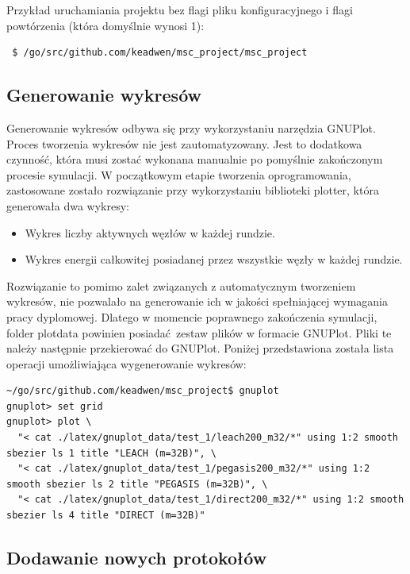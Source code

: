 \documentclass[a4paper,12pt,twoside,openany]{report}
\begin{document}
Przykład uruchamiania projektu bez flagi pliku konfiguracyjnego i flagi powtórzenia (która domyślnie wynosi 1):

\begin{lstlisting}
 $ /go/src/github.com/keadwen/msc_project/msc_project
\end{lstlisting}

\subsection{Generowanie wykresów}

Generowanie wykresów odbywa się przy wykorzystaniu narzędzia GNUPlot. Proces tworzenia wykresów nie jest zautomatyzowany.
Jest to dodatkowa czynność, która musi zostać wykonana manualnie po pomyślnie zakończonym procesie symulacji.
W początkowym etapie tworzenia oprogramowania, zastosowane zostało rozwiązanie przy wykorzystaniu biblioteki plotter, która
generowała dwa wykresy:

\begin{itemize}
 \item Wykres liczby aktywnych węzłów w każdej rundzie.
 \item Wykres energii całkowitej posiadanej przez wszystkie węzły w każdej rundzie.
\end{itemize}

Rozwiązanie to pomimo zalet związanych z automatycznym tworzeniem wykresów, nie pozwalało na generowanie ich w jakości spełniającej
wymagania pracy dyplomowej. Dlatego w momencie poprawnego zakończenia symulacji, folder plotdata powinien posiadać zestaw plików w formacie GNUPlot.
Pliki te należy następnie przekierować do GNUPlot. Poniżej przedstawiona została lista operacji umożliwiająca wygenerowanie wykresów:

\begin{lstlisting}
~/go/src/github.com/keadwen/msc_project$ gnuplot
gnuplot> set grid
gnuplot> plot \
  "< cat ./latex/gnuplot_data/test_1/leach200_m32/*" using 1:2 smooth sbezier ls 1 title "LEACH (m=32B)", \
  "< cat ./latex/gnuplot_data/test_1/pegasis200_m32/*" using 1:2 smooth sbezier ls 2 title "PEGASIS (m=32B)", \
  "< cat ./latex/gnuplot_data/test_1/direct200_m32/*" using 1:2 smooth sbezier ls 4 title "DIRECT (m=32B)"
\end{lstlisting}

\newpage
\subsection{Dodawanie nowych protokołów}
\end{document}
